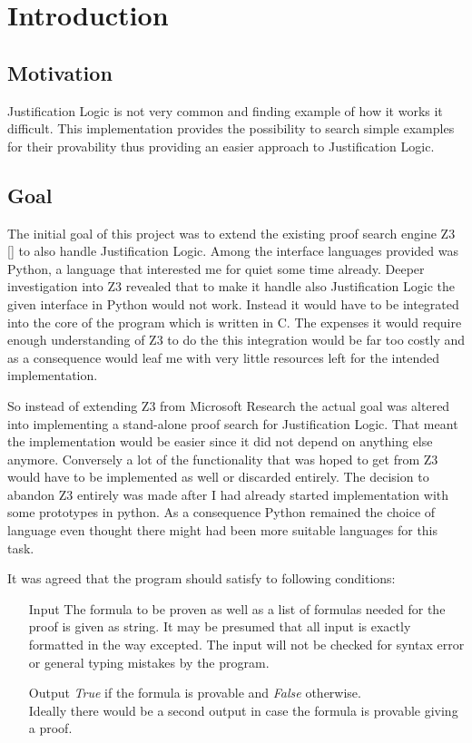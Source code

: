 \chapter{Introduction}

\section{Motivation}
Justification Logic is not very common and finding example of how it works it difficult. This implementation provides the possibility to search simple examples for their provability thus providing an easier approach to Justification Logic.

\section{Goal}
The initial goal of this project was to extend the existing proof search engine Z3 [\cite{z3}] to also handle Justification Logic. Among the interface languages provided was Python, a language that interested me for quiet some time already. Deeper investigation into Z3 revealed that to make it handle also Justification Logic the given interface in Python would not work. Instead it would have to be integrated into the core of the program which is written in C. The expenses it would require enough understanding of Z3 to do the this integration would be far too costly and as a consequence would leaf me with very little resources left for the intended implementation.

So instead of extending Z3 from Microsoft Research the actual goal was altered into implementing a stand-alone proof search for Justification Logic. That meant the implementation would be easier since it did not depend on anything else anymore. Conversely a lot of the functionality that was hoped to get from Z3 would have to be implemented as well or discarded entirely. The decision to abandon Z3 entirely was made after I had already started implementation with some prototypes in python. As a consequence Python remained the choice of language even thought there might had been more suitable languages for this task.

It was agreed that the program should satisfy to following conditions:

\begin{itemize}
	\item[Input] The formula to be proven as well as a list of formulas needed for the proof is given as string. It may be presumed that all input is exactly formatted in the way excepted. The input will not be checked for syntax error or general typing mistakes by the program.
	\item[Output] \emph{True} if the formula is provable and \emph{False} otherwise. \\Ideally there would be a second output in case the formula is provable giving a proof.
\end{itemize}

